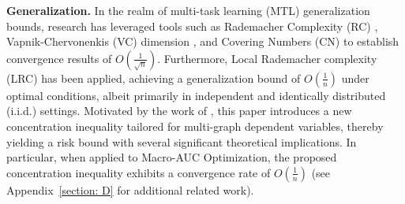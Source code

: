 \textbf{Generalization.} In the realm of multi-task learning (MTL) generalization bounds, research has leveraged tools such as Rademacher Complexity (RC) \cite{maurer06rade,maurer06linear,kakade12}, Vapnik-Chervonenkis (VC) dimension \cite{vcoriginal00}, and Covering Numbers (CN) \cite{baxter00,maurer2016benefit} to establish convergence results of $O(\frac{1}{\sqrt{n}})$. Furthermore, Local Rademacher complexity (LRC) \cite{yousefi18,watkins2023optimistic} has been applied, achieving a generalization bound of $O(\frac{1}{n})$ under optimal conditions, albeit primarily in independent and identically distributed (i.i.d.) settings. Motivated by the work of \citet{jason04,ralaivola2015entropy,wu2023macro-auc}, this paper introduces a new concentration inequality tailored for multi-graph dependent variables, thereby yielding a risk bound with several significant theoretical implications. In particular, when applied to Macro-AUC Optimization, the proposed concentration inequality exhibits a convergence rate of $O(\frac{1}{n})$ (see Appendix~\ref{section: D} for additional related work).











